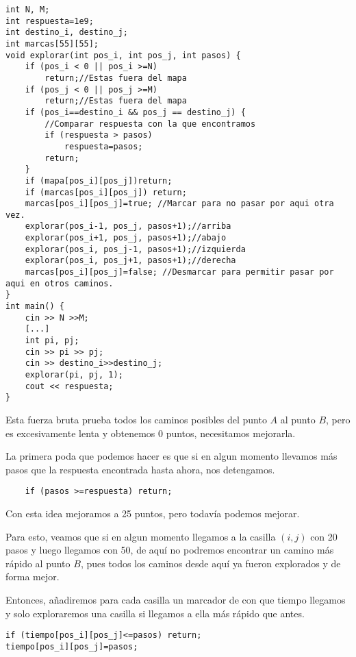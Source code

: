 \begin{minipage}{\linewidth}
\begin{lstlisting}
int N, M;
int respuesta=1e9;
int destino_i, destino_j;
int marcas[55][55];
void explorar(int pos_i, int pos_j, int pasos) {
	if (pos_i < 0 || pos_i >=N)
		return;//Estas fuera del mapa
	if (pos_j < 0 || pos_j >=M)
		return;//Estas fuera del mapa
	if (pos_i==destino_i && pos_j == destino_j) {
		//Comparar respuesta con la que encontramos
		if (respuesta > pasos)
			respuesta=pasos;
		return;
	}
	if (mapa[pos_i][pos_j])return;
	if (marcas[pos_i][pos_j]) return;
	marcas[pos_i][pos_j]=true; //Marcar para no pasar por aqui otra vez.	
	explorar(pos_i-1, pos_j, pasos+1);//arriba
	explorar(pos_i+1, pos_j, pasos+1);//abajo
	explorar(pos_i, pos_j-1, pasos+1);//izquierda
	explorar(pos_i, pos_j+1, pasos+1);//derecha	
	marcas[pos_i][pos_j]=false; //Desmarcar para permitir pasar por aqui en otros caminos.	
}
int main() {
	cin >> N >>M;
	[...]
	int pi, pj;
	cin >> pi >> pj;
	cin >> destino_i>>destino_j;
	explorar(pi, pj, 1);
	cout << respuesta;
}

\end{lstlisting}
\end{minipage}

Esta fuerza bruta prueba todos los caminos posibles del punto \(A\) al punto \(B\), pero es excesivamente lenta y obtenemos 0 puntos, necesitamos mejorarla.

La primera poda que podemos hacer es que si en algun momento llevamos más pasos que la respuesta encontrada hasta ahora, nos detengamos.

\begin{lstlisting}
	if (pasos >=respuesta) return;
\end{lstlisting}

Con esta idea mejoramos a 25 puntos, pero todavía podemos mejorar.

Para esto, veamos que si en algun momento llegamos a la casilla \((i, j)\) con 20 pasos y luego llegamos con 50, de aquí no podremos encontrar un camino más rápido al punto \(B\), pues todos los caminos desde aquí ya fueron explorados y de forma mejor.

Entonces, añadiremos para cada casilla un marcador de con que tiempo llegamos y solo exploraremos una casilla si llegamos a ella más rápido que antes.
\begin{lstlisting}
if (tiempo[pos_i][pos_j]<=pasos) return;
tiempo[pos_i][pos_j]=pasos;
\end{lstlisting}


